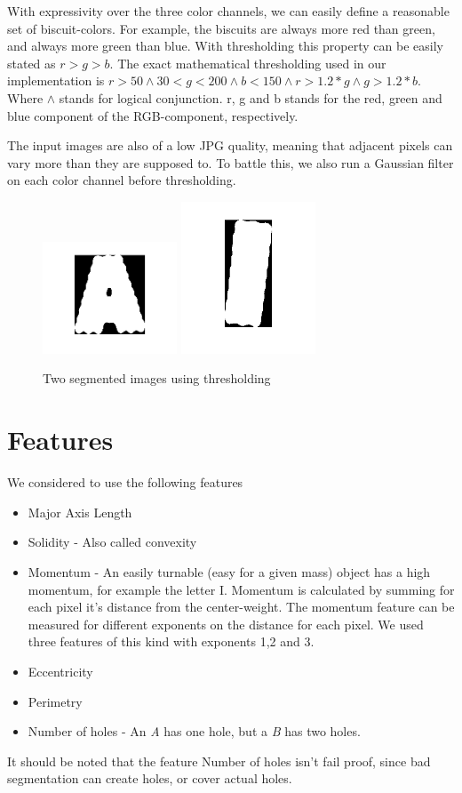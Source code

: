 \documentclass[a4paper,11pt]{article}
\begin{document}
With expressivity over the three color channels, 
we can easily define a reasonable set of biscuit-colors.
For example, the biscuits are always more red than green, and always more green than blue.
With thresholding this property can be easily stated as $r>g>b$.
The exact mathematical thresholding used in our implementation is
$ r > 50 \wedge 30 < g < 200 \wedge b < 150 \wedge r > 1.2*g \wedge g > 1.2*b $.
Where $\wedge$ stands for logical conjunction. r, g and b stands for the red, green and blue component of the RGB-component, respectively.

The input images are also of a low JPG quality, meaning that adjacent pixels can vary more than they are supposed to.
To battle this, we also run a Gaussian filter on each color channel before thresholding.


\begin{figure}[]
\begin{center}
\includegraphics[width=40mm]{seg_a.png}
\includegraphics[width=40mm]{seg_i.png}
\end{center}
\caption{Two segmented images using thresholding}
\label{fig:segmented}
\end{figure}


\section{Features}
We considered to use the following features
\begin{itemize}
\item Major Axis Length
\item Solidity - Also called convexity
\item Momentum - An easily turnable (easy for a given mass) object has a high momentum, for example the letter I. Momentum is calculated by summing for each pixel it's distance from the center-weight. The momentum feature can be measured for different exponents on the distance for each pixel. We used three features of this kind with exponents 1,2 and 3.
\item Eccentricity
\item Perimetry
\item Number of holes - An \emph{A} has one hole, but a \emph{B} has two holes.
\end{itemize}
It should be noted that the feature Number of holes isn't fail proof,
since bad segmentation can create holes, or cover actual holes.
\end{document}
